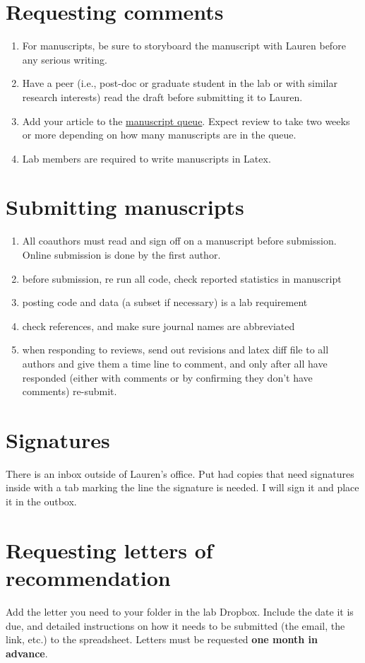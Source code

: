 \documentclass[12pt]{article}
\begin{document}
\section{Requesting comments}
\begin{enumerate}
\item For manuscripts, be sure to storyboard the manuscript with
  Lauren before any serious writing.
\item Have a peer (i.e., post-doc or graduate student in the lab or
  with similar research interests) read the draft before submitting it
  to Lauren.
\item Add your article to the
  \href{https://drive.google.com/a/ucr.edu/file/d/0B32TI_00hnPfVDJmVk5pR045Tnc/view?usp=sharing}{manuscript
    queue}. Expect review to take two weeks or more depending on how
  many manuscripts are in the queue.
\item Lab members are required to write manuscripts in Latex.
\end{enumerate}

\section{Submitting manuscripts}
\begin{enumerate}
\item All coauthors must read and sign off on a manuscript before
  submission. Online submission is done by the first author.
\item before submission, re run all code, check reported statistics in
  manuscript
\item posting code and data (a subset if necessary) is a lab
  requirement
\item check references, and make sure journal names are abbreviated
\item when responding to reviews, send out revisions and latex diff
  file to all authors and give them a time line to comment, and only
  after all have responded (either with comments or by confirming they
  don't have comments) re-submit.
\end{enumerate}

\section{Signatures}
There is an inbox outside of Lauren's office. Put had copies that need
signatures inside with a tab marking the line the signature is
needed. I will sign it and place it in the outbox.

\section{Requesting letters of recommendation}
Add the letter you need to your folder in the lab Dropbox. Include the
date it is due, and detailed instructions on how it needs to be
submitted (the email, the link, etc.) to the spreadsheet. Letters must
be requested \textbf{one month in advance}.
\end{document}
